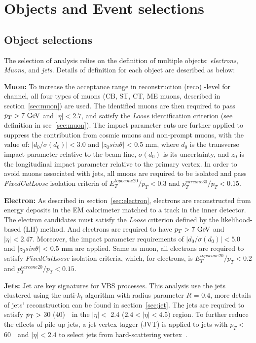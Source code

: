 \section{Objects and Event selections}
\label{sec:vbszz_selection}

\subsection{Object selections}

The selection of analysis relies on the definition of multiple objects: \textit{electrons}, \textit{Muons}, and \textit{jets}.
Details of definition for each object are described as below:

\textbf{Muon:} 
To increase the acceptance range in reconstruction (reco) -level for \llll channel, all four types of muons 
(CB, ST, CT, ME muons, described in section~\ref{sec:muon}) are used.
The identified muons are then required to pass $p_{T} > 7~\text{Ge\kern -0.1em V}$ and $|\eta| < 2.7$,
and satisfy the \textit{Loose} identification criterion (see definition in sec~\ref{sec:muon}).
The impact parameter cuts are further applied to suppress the contribution from cosmic muons and non-prompt muons,
with the value of: $|d_{0}/\sigma(d_{0})| < 3.0$ and $|z_{0} sin\theta|$ < 0.5 mm,
where $d_{0}$ is the transverse impact parameter relative to the beam line, $\sigma(d_{0})$ is its uncertainty, 
and $z_{0}$ is the longitudinal impact parameter relative to the primary vertex.
In order to avoid muons associated with jets, all muons are required to be isolated and pass \textit{FixedCutLoose} isolation criteria of $E_{T}^{topocone20} / p_{T} < 0.3$ and $p_{T}^{varcone30} / p_{T} < 0.15$.

\textbf{Electron:} 
As described in section~\ref{sec:electron}, electrons are reconstructed from energy deposits in the EM calorimeter matched to a track in the inner detector.
The electron candidates must satisfy the \textit{Loose} criterion defined by the likelihood-based (LH) method.
And electrons are required to have $p_{T} > 7~\text{Ge\kern -0.1em V}$ and $|\eta| < 2.47$.
Moreover, the impact parameter requirements of $|d_{0}/\sigma(d_{0})| < 5.0$ and $|z_{0} sin\theta|$ < 0.5 mm are applied.
Same as muon, all electrons are required to satisfy \textit{FixedCutLoose} isolation criteria,
which, for electrons, is $E_{T}^{topocone20} / p_{T} < 0.2$ and $p_{T}^{varcone20} / p_{T} < 0.15$.

\textbf{Jets:} 
Jet are key signatures for VBS processes. 
This analysis use the jets clustered using the anti-$k_t$ algorithm with radius parameter $R$ = 0.4, more details of jets' reconstruction can be found in section~\ref{sec:jet}.
The jets are required to satisfy $p_{\text{T}} >$ 30 (40)~\gev~in the $|\eta| <$ 2.4 ($2.4 < |\eta| < 4.5)$ region.
To further reduce the effects of pile-up jets, a jet vertex tagger (JVT) is applied to jets with $p_{T} <$ 60~\gev~and $|\eta| < 2.4$ to select jets from hard-scattering vertex~\cite{PERF-2014-03}.

